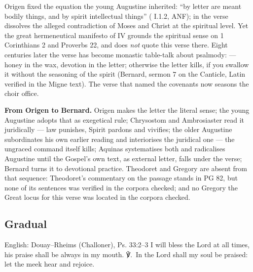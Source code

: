 \begin{witnessnote}
Origen fixed the equation the young Augustine inherited: ``by letter are
meant bodily things, and by spirit intellectual things'' ( I.1.2, ANF); in  the verse dissolves the
alleged contradiction of Moses and Christ at the spiritual level. Yet the
great hermeneutical manifesto of  IV grounds the spiritual sense on 1 Corinthians 2 and Proverbs 22, and does
\textit{not} quote this verse there. Eight centuries later the verse has
become monastic table-talk about psalmody:  --- honey in the wax, devotion in the letter; otherwise the letter
kills, if you swallow it without the seasoning of the spirit (Bernard,
sermon 7 on the Canticle, Latin verified in the Migne text). The verse that
named the covenants now seasons the choir office.
\end{witnessnote}

\textbf{From Origen to Bernard.} Origen makes the
letter the literal sense; the young Augustine adopts that as exegetical rule;
Chrysostom and Ambrosiaster read it juridically --- law punishes,
Spirit pardons and vivifies; the older Augustine subordinates his own earlier
reading and interiorises the juridical one --- the ungraced command itself
kills; Aquinas systematises both and radicalises Augustine until the Gospel's
own text, as external letter, falls under the verse; Bernard turns it to
devotional practice. Theodoret and Gregory are absent from that sequence:
Theodoret's commentary on the passage stands in PG 82, but none of its
sentences was verified in the corpora checked; and no Gregory the Great locus for this verse was
located in the corpora checked.

\elementguard
\subsection*{Gradual }


\begin{namedtranslation}{English: Douay--Rheims (Challoner), Ps. 33:2--3}
I will bless the Lord at all times, his praise shall be always in my mouth.
℣.~In the Lord shall my soul be praised: let the meek hear and rejoice.
\end{namedtranslation}

